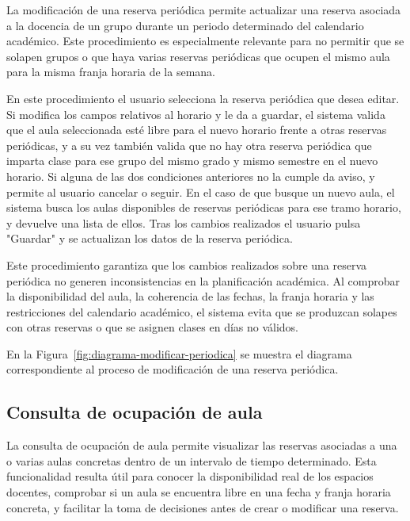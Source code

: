 La modificación de una reserva periódica permite actualizar una reserva asociada a la docencia de un grupo durante un periodo determinado del calendario académico. Este procedimiento es especialmente relevante para no permitir que se solapen grupos o que haya varias reservas periódicas que ocupen el mismo aula para la misma franja horaria de la semana.

En este procedimiento el usuario selecciona la reserva periódica que desea editar. Si modifica los campos relativos al horario y le da a guardar, el sistema valida que el aula seleccionada esté libre para el nuevo horario frente a otras reservas periódicas, y a su vez también valida que no hay otra reserva periódica que imparta clase para ese grupo del mismo grado y mismo semestre en el nuevo horario. Si alguna de las dos condiciones anteriores no la cumple da aviso, y permite al usuario cancelar o seguir. En el caso de que busque un nuevo aula, el sistema busca los aulas disponibles de reservas periódicas para ese tramo horario, y devuelve una lista de ellos. Tras los cambios realizados el usuario pulsa "Guardar" y se actualizan los datos de la reserva periódica.

Este procedimiento garantiza que los cambios realizados sobre una reserva periódica no generen inconsistencias en la planificación académica. Al comprobar la disponibilidad del aula, la coherencia de las fechas, la franja horaria y las restricciones del calendario académico, el sistema evita que se produzcan solapes con otras reservas o que se asignen clases en días no válidos.

En la Figura~\ref{fig:diagrama-modificar-periodica} se muestra el diagrama correspondiente al proceso de modificación de una reserva periódica.


\subsection{Consulta de ocupación de aula}

La consulta de ocupación de aula permite visualizar las reservas asociadas a una o varias aulas concretas dentro de un intervalo de tiempo determinado. Esta funcionalidad resulta útil para conocer la disponibilidad real de los espacios docentes, comprobar si un aula se encuentra libre en una fecha y franja horaria concreta, y facilitar la toma de decisiones antes de crear o modificar una reserva.

